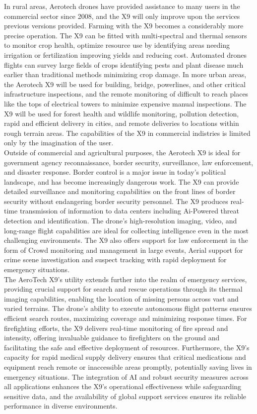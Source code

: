 In rural areas, Aerotech drones have provided assistance to many users in the commercial sector since 2008, and the X9 will only improve upon the services previous versions provided. Farming with the X9 becomes a considerably more precise operation. The X9 can be fitted with multi-spectral and thermal sensors to monitor crop health, optimize resource use by identifying areas needing irrigation or fertilization improving yields and reducing cost. Automated drones flights can survey large fields of crops identifying pests and plant disease much earlier than traditional methods minimizing crop damage. 
In more urban areas, the Aerotech X9 will be used for building, bridge, powerlines, and other critical infrastructure inspections, and the remote monitoring of difficult to reach places like the tops of electrical towers to minimize expensive manual inspections. The X9 will be used for forest health and wildlife monitoring, pollution detection, rapid and efficient delivery in cities, and remote deliveries to locations within rough terrain areas. The capabilities of the X9 in commercial indistries is limited only by the imagination of the user. \\
Outside of commercial and agricultural purposes, the Aerotech X9 is ideal for government agency reconnaissance, border security, surveillance, law enforcement, and disaster response. Border control is a major issue in today's political landscape, and has become increasingly dangerous work. The X9 can provide detailed surveillance and monitoring capabilities on the front lines of border security without endangering border security personnel. The X9 produces real-time transmission of information to data centers including Ai-Powered threat detection and identification. The drone's high-resolution imaging, video, and long-range flight capabilities are ideal for collecting intelligence even in the most challenging environments. The X9 also offers support for law enforcement in the form of Crowd monitoring and management in large events, Aerial support for crime scene investigation and suspect tracking with rapid deployment for emergency situations. \\
The AeroTech X9's utility extends further into the realm of emergency services, providing crucial support for search and rescue operations through its thermal imaging capabilities, enabling the location of missing persons across vast and varied terrains. The drone's ability to execute autonomous flight patterns ensures efficient search routes, maximizing coverage and minimizing response times. For firefighting efforts, the X9 delivers real-time monitoring of fire spread and intensity, offering invaluable guidance to firefighters on the ground and facilitating the safe and effective deployment of resources. Furthermore, the X9's capacity for rapid medical supply delivery ensures that critical medications and equipment reach remote or inaccessible areas promptly, potentially saving lives in emergency situations. The integration of AI and robust security measures across all applications enhances the X9's operational effectiveness while safeguarding sensitive data, and the availability of global support services ensures its reliable performance in diverse environments.